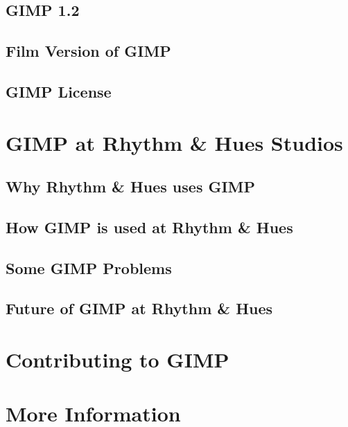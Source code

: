 \documentclass{report}
\begin{document}
\section{GIMP 1.2}
\label{sec:GIMP_1.2}


\section{Film Version of GIMP} 
\label{sec:Film_Version_of_GIMP}


\section{GIMP License}
\label{sec:GIMP_License}



\chapter{GIMP at Rhythm \& Hues Studios}
\label{ch:GIMP_at_Rhythm_Hues}


\section{Why Rhythm \& Hues uses GIMP}
\label{sec:Why_Rhythm_Hues_uses_GIMP}


\section{How GIMP is used at Rhythm \& Hues}
\label{sec:How_GIMP_is_used_at_Rhythm_Hues}


\section{Some GIMP Problems}
\label{sec:Some_GIMP_Problems}


\section{Future of GIMP at Rhythm \& Hues} 
\label{sec:Future_of_GIMP_at_Rhythm_Hues}



\chapter{Contributing to GIMP}
\label{ch:Contributing_to_GIMP}



\chapter{More Information}
\label{ch:More_Information}


{
\small


}
\end{document}
